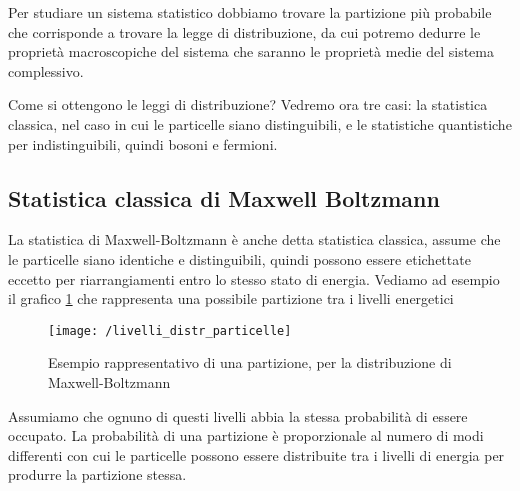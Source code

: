 Per studiare un sistema statistico dobbiamo trovare la partizione più probabile che corrisponde a trovare la legge di distribuzione, da cui potremo dedurre le proprietà macroscopiche del sistema che saranno le proprietà medie del sistema complessivo.

Come si ottengono le leggi di distribuzione? Vedremo ora tre casi:
la statistica classica, nel caso in cui le particelle siano distinguibili, e le statistiche quantistiche per indistinguibili, quindi bosoni e fermioni.


\subsection{Statistica classica di Maxwell Boltzmann}
La statistica di Maxwell-Boltzmann è anche detta statistica classica, assume che le particelle siano identiche e distinguibili, quindi possono essere etichettate eccetto per riarrangiamenti entro lo stesso stato di energia.
Vediamo ad esempio il grafico \ref{esempio_partizione} che rappresenta una possibile partizione tra i livelli energetici
\begin{figure}[h]
\centering
\texttt{[image: /livelli\_distr\_particelle]}
\caption{Esempio rappresentativo di una partizione, per la distribuzione di Maxwell-Boltzmann}
\label{esempio_partizione}
\end{figure}
Assumiamo che ognuno di questi livelli abbia la stessa probabilità di essere occupato.
La probabilità di una partizione è proporzionale al numero di modi differenti con cui le particelle possono essere distribuite tra i livelli di energia per produrre la partizione stessa.


